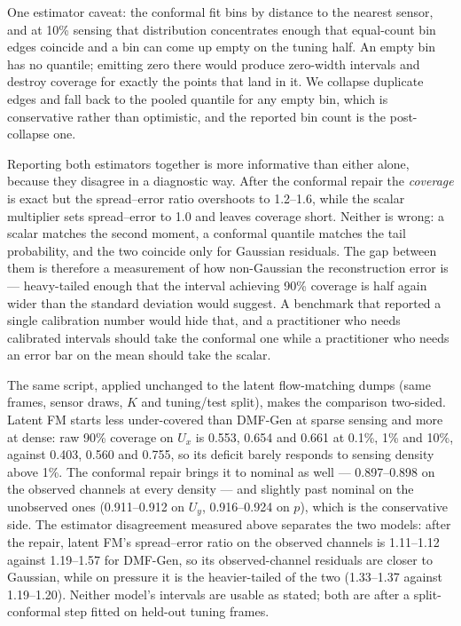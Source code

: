 \documentclass[aip,pof,reprint,amsmath,amssymb,superscriptaddress]{revtex4-1}
\newcommand{\dmfgen}{DMF-Gen}
\begin{document}
One estimator caveat: the conformal fit bins by
distance to the nearest sensor, and at 10\% sensing that distribution
concentrates enough that equal-count bin edges coincide and a bin can come up
empty on the tuning half. An empty bin has no quantile; emitting zero there
would produce zero-width intervals and destroy coverage for exactly the points
that land in it. We collapse duplicate edges and fall back to the pooled
quantile for any empty bin, which is conservative rather than optimistic, and
the reported bin count is the post-collapse one.

Reporting both estimators together is more informative than either alone,
because they disagree in a diagnostic way. After the conformal repair the
\emph{coverage} is exact but the spread--error ratio overshoots to 1.2--1.6,
while the scalar multiplier sets spread--error to 1.0 and leaves coverage
short. Neither is wrong: a scalar matches the second moment, a conformal
quantile matches the tail probability, and the two coincide only for Gaussian
residuals. The gap between them is therefore a measurement of how
non-Gaussian the reconstruction error is --- heavy-tailed enough that the
interval achieving 90\% coverage is half again wider than the standard
deviation would suggest. A benchmark that reported a single calibration
number would hide that, and a practitioner who needs calibrated intervals should
take the conformal one while a practitioner who needs an error bar on the mean
should take the scalar.

The same script, applied unchanged to the latent flow-matching dumps (same
frames, sensor draws, $K$ and tuning/test split), makes the comparison
two-sided. Latent FM starts less under-covered than \dmfgen{} at sparse sensing
and more at dense: raw 90\% coverage on $U_x$ is 0.553, 0.654 and 0.661 at
0.1\%, 1\% and 10\%, against 0.403, 0.560 and 0.755, so its deficit barely
responds to sensing density above 1\%. The conformal repair brings it to
nominal as well --- 0.897--0.898 on the observed channels at every density ---
and slightly past nominal on the unobserved ones (0.911--0.912 on $U_y$,
0.916--0.924 on $p$), which is the conservative side. The estimator
disagreement measured above separates the two models: after the repair, latent
FM's spread--error ratio on the observed channels is 1.11--1.12 against
1.19--1.57 for \dmfgen{}, so its observed-channel residuals are closer to
Gaussian, while on pressure it is the heavier-tailed of the two (1.33--1.37
against 1.19--1.20). Neither model's intervals are usable as stated; both are
after a split-conformal step fitted on held-out tuning frames.
\end{document}
